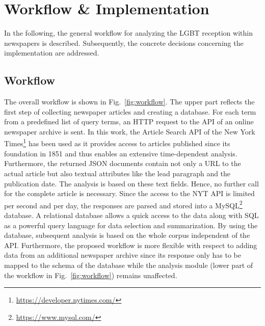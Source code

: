 \documentclass[10pt,a4paper,twocolumn]{scrartcl}
\begin{document}
\section{Workflow \& Implementation}\label{sec:workflow}
In the following, the general workflow for analyzing the LGBT reception within newspapers is described. Subsequently, the concrete decisions concerning the implementation are addressed.

\subsection*{Workflow} The overall workflow is shown in Fig.~\ref{fig:workflow}. The upper part reflects the first step of collecting newspaper articles and creating a database. For each term from a predefined list of query terms, an HTTP request to the API of an online newspaper archive is sent. In this work, the Article Search API of the New York Times\footnote{\url{https://developer.nytimes.com/}} has been used as it provides access to articles published since its foundation in 1851 and thus enables an extensive time-dependent analysis. Furthermore, the returned JSON documents contain not only a URL to the actual article but also textual attributes like the lead paragraph and the publication date. The analysis is based on these text fields. Hence, no further call for the complete article is necessary. Since the access to the NYT API is limited per second and per day, the responses are parsed and stored into a MySQL\footnote{\url{https://www.mysql.com/}} database. A relational database allows a quick access to the data along with SQL as a powerful query language for data selection and summarization. By using the database, subsequent analysis is based on the whole corpus independent of the API. Furthermore, the proposed workflow is more flexible with respect to adding data from an additional newspaper archive since its response only has to be mapped to the schema of the database while the analysis module (lower part of the workflow in Fig.~\ref{fig:workflow}) remains unaffected.
\end{document}
